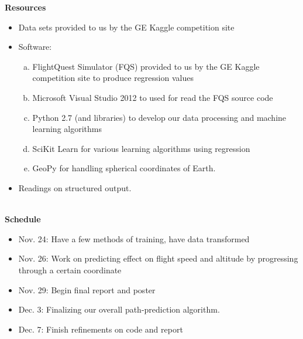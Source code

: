 \documentclass{article}[9pt]
\begin{document}
\noindent
\Large{\textbf{Resources}}
\begin{itemize}
    \item Data sets provided to us by the GE Kaggle competition site
    \item Software: 
        \begin{enumerate}[(a)]
            \item FlightQuest Simulator (FQS) provided to us by the GE Kaggle competition site to produce regression values
            \item Microsoft Visual Studio 2012 to used for read the FQS source code
            \item Python 2.7 (and libraries) to develop our data processing and machine learning algorithms
            \item SciKit Learn for various learning algorithms using regression
            \item GeoPy for handling spherical coordinates of Earth.
        \end{enumerate}
    \item Readings on structured output. 
   \end{itemize}
\hspace*{\fill}\\
\Large{\textbf{Schedule}}
\noindent
\begin{itemize}
	\item Nov. 24: Have a few methods of training, have data transformed
	\item Nov. 26: Work on predicting effect on flight speed and altitude by progressing through a certain coordinate
	\item Nov. 29: Begin final report and poster
	\item Dec. 3: Finalizing our overall path-prediction algorithm.
	\item Dec. 7: Finish refinements on code and report 
\end{itemize}
\end{document}
